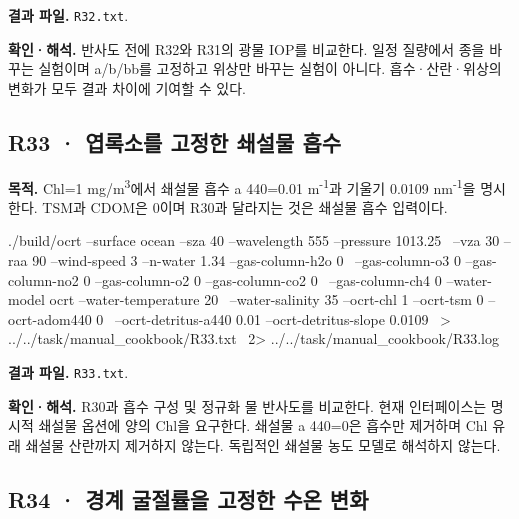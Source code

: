\textbf{결과 파일. }\texttt{R32.txt}.

\textbf{확인·해석. }반사도 전에 R32와 R31의 광물 IOP를 비교한다. 일정 질량에서 종을 바꾸는 실험이며 a/b/bb를 고정하고 위상만 바꾸는 실험이 아니다. 흡수·산란·위상의 변화가 모두 결과 차이에 기여할 수 있다.


\subsection{R33 · 엽록소를 고정한 쇄설물 흡수}
\label{sec:auto:09_cookbook:6.8}

\label{recipe:R33}

\textbf{목적. }Chl=1 mg/m\textsuperscript{3}에서 쇄설물 흡수 a 440=0.01 m\textsuperscript{-1}과 기울기 0.0109 nm\textsuperscript{-1}을 명시한다. TSM과 CDOM은 0이며 R30과 달라지는 것은 쇄설물 흡수 입력이다.

\noindent\begin{minipage}{\linewidth}
\begin{ManualCode}

./build/ocrt --surface ocean --sza 40 --wavelength 555 --pressure 1013.25 \
  --vza 30 --raa 90 --wind-speed 3 --n-water 1.34 --gas-column-h2o 0 \
  --gas-column-o3 0 --gas-column-no2 0 --gas-column-o2 0 --gas-column-co2 0 \
  --gas-column-ch4 0 --water-model ocrt --water-temperature 20 \
  --water-salinity 35 --ocrt-chl 1 --ocrt-tsm 0 --ocrt-adom440 0 \
  --ocrt-detritus-a440 0.01 --ocrt-detritus-slope 0.0109 \
  > ../../task/manual_cookbook/R33.txt \
  2> ../../task/manual_cookbook/R33.log

\end{ManualCode}
\end{minipage}\par

\textbf{결과 파일. }\texttt{R33.txt}.

\textbf{확인·해석. }R30과 흡수 구성 및 정규화 물 반사도를 비교한다. 현재 인터페이스는 명시적 쇄설물 옵션에 양의 Chl을 요구한다. 쇄설물 a 440=0은 흡수만 제거하며 Chl 유래 쇄설물 산란까지 제거하지 않는다. 독립적인 쇄설물 농도 모델로 해석하지 않는다.


\subsection{R34 · 경계 굴절률을 고정한 수온 변화}
\label{sec:auto:09_cookbook:6.9}

